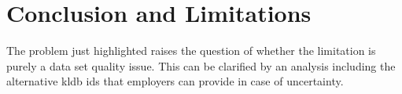 \documentclass[12pt, a4paper, titlepage]{article}
\begin{document}

  

\section{Conclusion and Limitations}

The problem just highlighted raises the question of whether the limitation is purely a data set quality issue. This can be clarified by an analysis including the alternative kldb ids that employers can provide in case of uncertainty.  
\end{document}
